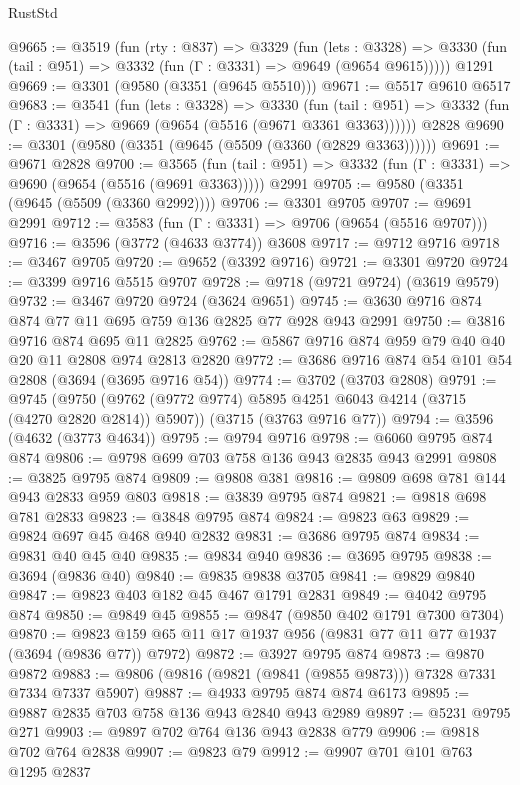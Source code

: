 \begin{lexlean}{RustStd}
\begin{coremodule}
@9665 := @3519
    (fun (rty : @837) =>
    @3329
      (fun (lets : @3328) =>
      @3330 (fun (tail : @951) => @3332 (fun (Γ : @3331) => @9649 (@9654 @9615)))))
    @1291
@9669 := @3301 (@9580 (@3351 (@9645 @5510)))
@9671 := @5517 @9610 @6517
@9683 := @3541
    (fun (lets : @3328) =>
    @3330
      (fun (tail : @951) => @3332 (fun (Γ : @3331) => @9669 (@9654 (@5516 (@9671 @3361 @3363))))))
    @2828
@9690 := @3301 (@9580 (@3351 (@9645 (@5509 (@3360 (@2829 @3363))))))
@9691 := @9671 @2828
@9700 := @3565
    (fun (tail : @951) => @3332 (fun (Γ : @3331) => @9690 (@9654 (@5516 (@9691 @3363)))))
    @2991
@9705 := @9580 (@3351 (@9645 (@5509 (@3360 @2992))))
@9706 := @3301 @9705
@9707 := @9691 @2991
@9712 := @3583 (fun (Γ : @3331) => @9706 (@9654 (@5516 @9707)))
@9716 := @3596 (@3772 (@4633 @3774)) @3608
@9717 := @9712 @9716
@9718 := @3467 @9705
@9720 := @9652 (@3392 @9716)
@9721 := @3301 @9720
@9724 := @3399 @9716 @5515 @9707
@9728 := @9718 (@9721 @9724) (@3619 @9579)
@9732 := @3467 @9720 @9724 (@3624 @9651)
@9745 := @3630 @9716 @874 @874 @77 @11 @695 @759 @136 @2825 @77 @928 @943 @2991
@9750 := @3816 @9716 @874 @695 @11 @2825
@9762 := @5867 @9716 @874 @959 @79 @40 @40 @20 @11 @2808 @974 @2813 @2820
@9772 := @3686 @9716 @874 @54 @101 @54 @2808 (@3694 (@3695 @9716 @54))
@9774 := @3702 (@3703 @2808)
@9791 := @9745
    (@9750 (@9762 (@9772 @9774) @5895 @4251 @6043 @4214 (@3715 (@4270 @2820 @2814)) @5907))
    (@3715 (@3763 @9716 @77))
@9794 := @3596 (@4632 (@3773 @4634))
@9795 := @9794 @9716
@9798 := @6060 @9795 @874 @874
@9806 := @9798 @699 @703 @758 @136 @943 @2835 @943 @2991
@9808 := @3825 @9795 @874
@9809 := @9808 @381
@9816 := @9809 @698 @781 @144 @943 @2833 @959 @803
@9818 := @3839 @9795 @874
@9821 := @9818 @698 @781 @2833
@9823 := @3848 @9795 @874
@9824 := @9823 @63
@9829 := @9824 @697 @45 @468 @940 @2832
@9831 := @3686 @9795 @874
@9834 := @9831 @40 @45 @40
@9835 := @9834 @940
@9836 := @3695 @9795
@9838 := @3694 (@9836 @40)
@9840 := @9835 @9838 @3705
@9841 := @9829 @9840
@9847 := @9823 @403 @182 @45 @467 @1791 @2831
@9849 := @4042 @9795 @874
@9850 := @9849 @45
@9855 := @9847 (@9850 @402 @1791 @7300 @7304)
@9870 := @9823 @159 @65 @11 @17 @1937 @956 (@9831 @77 @11 @77 @1937 (@3694 (@9836 @77)) @7972)
@9872 := @3927 @9795 @874
@9873 := @9870 @9872
@9883 := @9806 (@9816 (@9821 (@9841 (@9855 @9873))) @7328 @7331 @7334 @7337 @5907)
@9887 := @4933 @9795 @874 @874 @6173
@9895 := @9887 @2835 @703 @758 @136 @943 @2840 @943 @2989
@9897 := @5231 @9795 @271
@9903 := @9897 @702 @764 @136 @943 @2838 @779
@9906 := @9818 @702 @764 @2838
@9907 := @9823 @79
@9912 := @9907 @701 @101 @763 @1295 @2837

\end{coremodule}
\end{lexlean}
